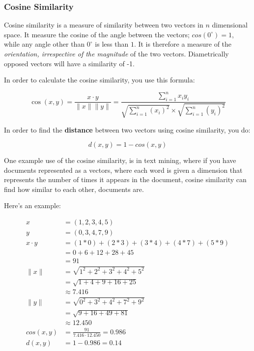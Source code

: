 \subsubsection{Cosine Similarity}

Cosine similarity is a measure of similarity between two vectors in $n$
dimensional space. It measure the cosine of the angle between the vectors;
$cos(0^{\circ}) = 1$, while any angle other than $0^{\circ}$ is less than $1$.
It is therefore a measure of the \textit{orientation, irrespective of the
magnitude} of the two vectors. Diametrically opposed vectors will have a
similarity of -1.

In order to calculate the cosine similarity, you use this formula:

\[
  \cos(x,y) = \frac{x \cdot y}{\|x\| \|y\|} = \frac{ \sum\limits_{i=1}^{n}{x_iy_i} }{ \sqrt{\sum\limits_{i=1}^{n}{(x_i)^2}} \times \sqrt{\sum\limits_{i=1}^{n}{(y_i)^2}} }
\]

In order to find the \textbf{distance} between two vectors using cosine
similarity, you do:

\[
  d(x,y) = 1 - cos(x,y)
\]  

One example use of the cosine similarity, is in text mining, where if you have
documents represented as a vectors, where each word is given a dimension that
represents the number of times it appears in the document, cosine similarity can
find how similar to each other, documents are.

Here's an example:

\begin{align*}
  x &= (1,2,3,4,5)\\
  y &= (0,3,4,7,9)\\
  x \cdot y &= (1 * 0) + (2 * 3) + (3 * 4) + (4 * 7) + (5 * 9)\\
           &= 0 + 6 + 12 + 28 + 45\\
           &= 91\\
  \|x\| &= \sqrt{1^2 + 2^2 + 3^2 + 4^2 + 5^2}\\
        &= \sqrt{1 + 4 + 9 + 16 + 25}\\
        &\approx 7.416\\
  \|y\| &= \sqrt{0^2 + 3^2 + 4^2 + 7^2 + 9^2}\\
        &= \sqrt{9 + 16 + 49 + 81}\\
        &\approx 12.450\\
  cos(x,y) &= \frac{91}{7.416 \cdot 12.450} = 0.986\\
  d(x,y) &= 1 - 0.986 = 0.14
\end{align*}

